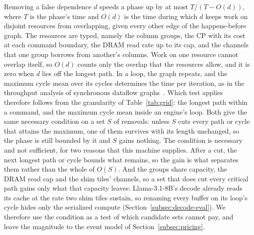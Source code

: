Removing a false dependence $d$ speeds a phase up by at most $T / (T - O(d))$, where $T$ is the phase's time and $O(d)$ is the time during which $d$ keeps work on disjoint resources from overlapping, given every other edge of the happens-before graph.
The resources are typed, namely the column groups, the CP with its cost at each command boundary, the DRAM read rate up to its cap, and the channels that one group borrows from another's columns.
Work on one resource cannot overlap itself, so $O(d)$ counts only the overlap that the resources allow, and it is zero when $d$ lies off the longest path.
In a loop, the graph repeats, and the maximum cycle mean over its cycles determines the time per iteration, as in the throughput analysis of synchronous dataflow graphs~\citep{ghamarian2006throughput}.
Which test applies therefore follows from the granularity of Table~\ref{tab:grid}: the longest path within a command, and the maximum cycle mean inside an engine's loop.
Both give the same necessary condition on a set $S$ of removals: unless $S$ cuts every path or cycle that attains the maximum, one of them survives with its length unchanged, so the phase is still bounded by it and $S$ gains nothing.
The condition is necessary and not sufficient, for two reasons that this machine supplies.
After a cut, the next longest path or cycle bounds what remains, so the gain is what separates them rather than the whole of $O(S)$.
And the groups share capacity, the DRAM read cap and the shim tiles' channels, so a set that does cut every critical path gains only what that capacity leaves: Llama-3.1-8B's decode already reads its cache at the rate two shim tiles sustain, so renaming every buffer on its loop's cycle hides only the serialized compute (Section~\ref{subsec:decode-eval}).
We therefore use the condition as a test of which candidate sets cannot pay, and leave the magnitude to the event model of Section~\ref{subsec:pricing}.

